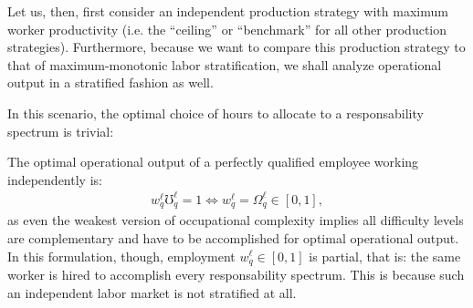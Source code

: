 \documentclass[hidelinks, nonatbib]{elsarticle}
\begin{document}
\begin{enumerate}
\begin{enumerate}
        Let us, then, first consider an independent production strategy with maximum worker productivity (i.e. the ``ceiling'' or ``benchmark'' for all other production strategies). Furthermore, because we want to compare this production strategy to that of maximum-monotonic labor stratification, we shall analyze operational output in a stratified fashion as well.

        In this scenario, the optimal choice of hours to allocate to a responsability spectrum is trivial:

        The optimal operational output of a perfectly qualified employee working independently is:
        \begin{gather}
            w_{q}^{\ell}
            \mho_{q}^{\ell}
            =
            1
            \iff
            w_{q}^{\ell}
            =
            \Omega_{q}^{\ell}
            \in [0,1]
            ,
        \end{gather}
        as even the weakest version of occupational complexity implies all difficulty levels are complementary and have to be accomplished for optimal operational output.
        In this formulation, though, employment $w_{q}^{\ell} \in [0,1]$ is partial, that is: the same worker is hired to accomplish every responsability spectrum. This is because such an independent labor market is not stratified at all.


\end{enumerate}
\end{enumerate}
\end{document}
